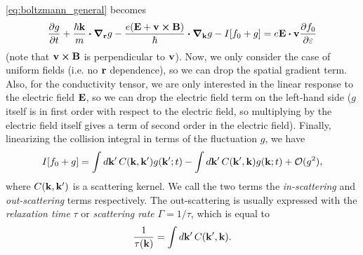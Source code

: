 \documentclass[12pt]{article}
\begin{document}
\eqref{eq:boltzmann_general} becomes
\begin{equation}
    \pdv{g}{t} + \frac{\hbar\vb{k}}{m}\vdot\grad_{\vb{r}} g
    - \frac{e(\vb{E} + \vb{v}\cross\vb{B})}{\hbar}\vdot\grad_{\vb{k}}g - I[f_0 + g]
    = e\vb{E}\vdot\vb{v}\pdv{f_0}{\varepsilon} \label{eq:boltzmann}
\end{equation}
(note that $\vb{v}\cross\vb{B}$ is perpendicular to $\vb{v}$). Now, we only consider the case of
uniform fields (i.e. no $\vb{r}$ dependence), so we can drop the spatial gradient term. Also, for
the conductivity tensor, we are only interested in the linear response to the electric field
$\vb{E}$, so we can drop the electric field term on the left-hand side ($g$ itself is in first order
with respect to the electric field, so multiplying by the electric field itself gives a term of
second order in the electric field). Finally, linearizing the collision integral in terms of the
fluctuation $g$, we have
\begin{equation}
    I[f_0 + g] = \int\dd{\vb{k'}} C(\vb{k}, \vb{k'}) g(\vb{k'}; t)
    - \int\dd{\vb{k'}} C(\vb{k'}, \vb{k}) g(\vb{k}; t) + \mathcal{O}(g^2),
\end{equation} 
where $C(\vb{k}, \vb{k'})$ is a scattering kernel. We call the two terms the \emph{in-scattering} and
\emph{out-scattering} terms respectively. The out-scattering is usually expressed with the
\emph{relaxation time} $\tau$ or \emph{scattering rate} $\Gamma=1/\tau$, which is equal to
\begin{equation}
    \frac{1}{\tau(\vb{k})} = \int\dd{\vb{k'}} C(\vb{k'}, \vb{k}).
    \label{eq:tau_kernel}
\end{equation}

\end{document}
